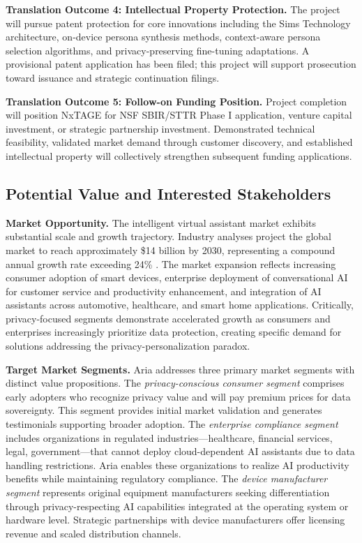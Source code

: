 \documentclass[11pt]{article}
\begin{document}
\textbf{Translation Outcome 4: Intellectual Property Protection.} The project will pursue patent protection for core innovations including the Sims Technology architecture, on-device persona synthesis methods, context-aware persona selection algorithms, and privacy-preserving fine-tuning adaptations. A provisional patent application has been filed; this project will support prosecution toward issuance and strategic continuation filings.

\textbf{Translation Outcome 5: Follow-on Funding Position.} Project completion will position NxTAGE for NSF SBIR/STTR Phase I application, venture capital investment, or strategic partnership investment. Demonstrated technical feasibility, validated market demand through customer discovery, and established intellectual property will collectively strengthen subsequent funding applications.

\vspace*{-8pt}
\subsection{Potential Value and Interested Stakeholders}
\vspace*{-8pt}
\textbf{Market Opportunity.} The intelligent virtual assistant market exhibits substantial scale and growth trajectory. Industry analyses project the global market to reach approximately \$14 billion by 2030, representing a compound annual growth rate exceeding 24\% \cite{grandview2023iva}. The market expansion reflects increasing consumer adoption of smart devices, enterprise deployment of conversational AI for customer service and productivity enhancement, and integration of AI assistants across automotive, healthcare, and smart home applications. Critically, privacy-focused segments demonstrate accelerated growth as consumers and enterprises increasingly prioritize data protection, creating specific demand for solutions addressing the privacy-personalization paradox.

\textbf{Target Market Segments.} Aria addresses three primary market segments with distinct value propositions. The \textit{privacy-conscious consumer segment} comprises early adopters who recognize privacy value and will pay premium prices for data sovereignty. This segment provides initial market validation and generates testimonials supporting broader adoption. The \textit{enterprise compliance segment} includes organizations in regulated industries---healthcare, financial services, legal, government---that cannot deploy cloud-dependent AI assistants due to data handling restrictions. Aria enables these organizations to realize AI productivity benefits while maintaining regulatory compliance. The \textit{device manufacturer segment} represents original equipment manufacturers seeking differentiation through privacy-respecting AI capabilities integrated at the operating system or hardware level. Strategic partnerships with device manufacturers offer licensing revenue and scaled distribution channels.
\end{document}
